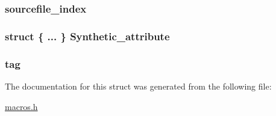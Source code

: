 \subsubsection[{sourcefile\+\_\+index}]{ sourcefile\+\_\+index}\label{structattribute__info__e_a84ee4fb337ef79f587712533075a6bbc}
\hypertarget{structattribute__info__e_a8da49bfad483b7963ee3ed73c52ca549}{}
\subsubsection[{Synthetic\+\_\+attribute}]{\setlength{\rightskip}{0pt plus 5cm}struct \{ ... \}  Synthetic\+\_\+attribute}\label{structattribute__info__e_a8da49bfad483b7963ee3ed73c52ca549}
\hypertarget{structattribute__info__e_a17726ed17c64ec8550633ebf17fd1a98}{}
\subsubsection[{tag}]{ tag}\label{structattribute__info__e_a17726ed17c64ec8550633ebf17fd1a98}


The documentation for this struct was generated from the following file\+:\begin{DoxyCompactItemize}
\item 
\hyperlink{macros_8h}{macros.\+h}\end{DoxyCompactItemize}

